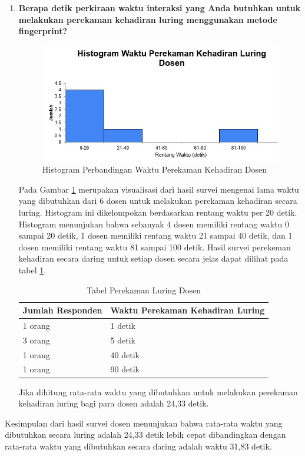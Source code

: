 \documentclass[a4paper,twoside]{article}
\begin{document}
\begin{enumerate}
\begin{enumerate}
			\item \textbf{Berapa detik perkiraan waktu interaksi yang Anda butuhkan untuk melakukan perekaman kehadiran luring menggunakan metode fingerprint?}
			\begin{figure}[H]
				\centering
				\includegraphics[scale=0.8]{Gambar/luringDosen.jpg}
				\caption{Histogram Perbandingan Waktu Perekaman Kehadiran Dosen} 
				\label{fig:luringDosen}
			\end{figure}
			Pada Gambar \ref{fig:luringDosen} merupakan visualisasi dari hasil survei mengenai lama waktu yang dibutuhkan dari 6 dosen untuk melakukan perekaman kehadiran secara luring. Histogram ini dikelompokan berdasarkan rentang waktu per 20 detik. Histogram menunjukan bahwa sebanyak 4 dosen memiliki rentang waktu 0 sampai 20 detik, 1 dosen memiliki rentang waktu 21 sampai 40 detik, dan 1 dosen memiliki rentang waktu 81 sampai 100 detik. Hasil survei perekeman kehadiran secara daring untuk setiap dosen secara jelas dapat dilihat pada tabel \ref{tab:luringDosen}.
			\begin{table}[ht]			
				\caption{Tabel Perekaman Luring Dosen}
				\centering
				\begin{tabular}{|p{4cm} |p{7cm}|}
					\hline
					Jumlah Responden &  Waktu Perekaman Kehadiran Luring \\ \hline     
					1 orang &  1 detik\\ \hline 
					3 orang &  5 detik\\ \hline 
					1 orang &  40 detik\\ \hline 
					1 orang &  90 detik\\ \hline 
				\end{tabular}
				\label{tab:luringDosen}
			\end{table}
		
			Jika dihitung rata-rata waktu yang dibutuhkan untuk melakukan perekaman kehadiran luring bagi para dosen adalah 24,33 detik.
		\end{enumerate}
		Kesimpulan dari hasil survei dosen menunjukan bahwa rata-rata waktu yang dibutuhkan secara luring adalah 24,33 detik lebih cepat dibandingkan dengan rata-rata waktu yang dibutuhkan secara daring adalah waktu 31,83 detik. 
		

\end{enumerate}
\end{document}
